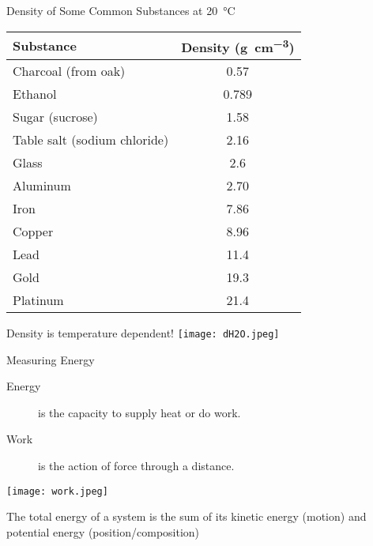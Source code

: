 \documentclass[notes=show]{beamer}
\begin{document}
\begin{frame}{Density of Some Common Substances at \SI{20}{\celsius}}
	\begin{center}
		\begin{tabular}{l S[table-format=2.3]}
			\toprule
			\bfseries Substance & \textbf{Density (\si{\gram\per\centi\meter\cubed})} \\
			\midrule
			Charcoal (from oak) & 0.57 \\
			Ethanol & 0.789 \\
			Sugar (sucrose) & 1.58 \\
			Table salt (sodium chloride) & 2.16 \\
			Glass & 2.6 \\
			Aluminum & 2.70 \\
			Iron & 7.86 \\
			Copper & 8.96 \\
			Lead & 11.4 \\
			Gold & 19.3 \\
			Platinum & 21.4 \\
			\bottomrule
		\end{tabular}
	\end{center}
\end{frame}


\begin{frame}{Density is temperature dependent!}
	\centering
	\texttt{[image: dH2O.jpeg]}
\end{frame}

\begin{frame}{Measuring Energy}
	\begin{description}
		\item[Energy] is the capacity to supply heat or do work.
		\item[Work] is the action of force through a distance.
	\end{description}

	\begin{center}
		\texttt{[image: work.jpeg]}
	\end{center}

	The \alert{total energy} of a system is the sum of its \alert{kinetic
	energy} (motion) and \alert{potential energy} (position/composition)
\end{frame}
\end{document}
